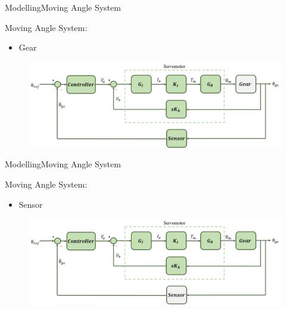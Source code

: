 \begin{frame}{Modelling}{Moving Angle System}
  \begin{block}{Moving Angle System:}
	  \begin{itemize}
	  	\item Gear
	  \end{itemize}
	  \begin{figure}
        \includegraphics[scale=0.26]{../report/figures/servo+gear+noise+gear.png}
      \end{figure}  
  \end{block}
\end{frame}

\begin{frame}{Modelling}{Moving Angle System}
  \begin{block}{Moving Angle System:}

	  \begin{itemize}
	  	\item Sensor
	  \end{itemize}

	  \begin{figure}
        \includegraphics[scale=0.26]{../report/figures/servo+gear+noise+sensor.png}
      \end{figure}
  
  \end{block}
\end{frame}


